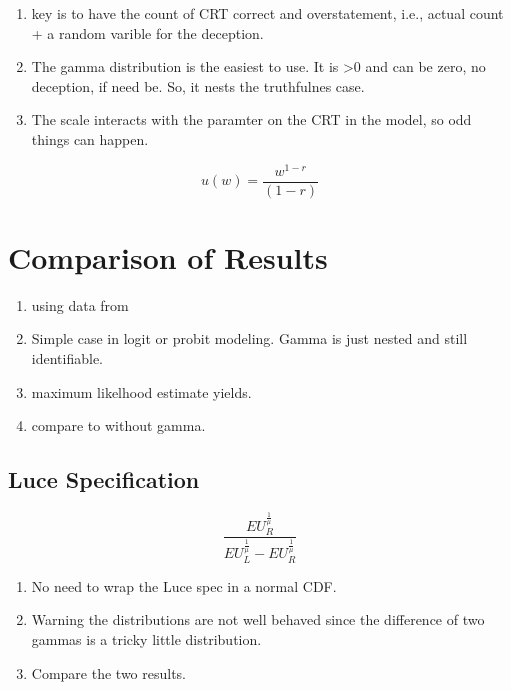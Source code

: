 \documentclass{article}
\begin{document}
  \begin{enumerate}
    \item key is to have the count of CRT correct and overstatement, i.e., actual count + a random varible for the deception.
    \item The gamma distribution is the easiest to use.  It is >0 and can be zero, no deception, if need be.  So, it nests the truthfulnes case.
    \item The scale interacts with the paramter on the CRT in the model, so odd things can happen.  
  \end{enumerate}
  
  
  
\begin{equation}\label{eq:CRRA}
u(w) = \frac{w^{1-r}}{(1-r)}
\end{equation}

\section{Comparison of Results}

  \begin{enumerate}
  \item using data from \cite{taylor2013bias}
    \item Simple case in logit or probit modeling.  Gamma is just nested and still identifiable.
    \item maximum likelhood estimate yields.
    \item compare to without gamma.
  \end{enumerate}

  \subsection{Luce Specification}
  
\begin{equation}
\frac{EU_R^{\frac{1}{\mu}}}{EU_L^{\frac{1}{\mu}}-EU_R^{\frac{1}{\mu}}}
\end{equation}
    
    \begin{enumerate}
      \item  No need to wrap the Luce spec in a normal CDF.
      \item Warning the distributions are not well behaved since the difference of two gammas is a tricky little distribution.
      \item Compare the two results.
    \end{enumerate}
\end{document}
